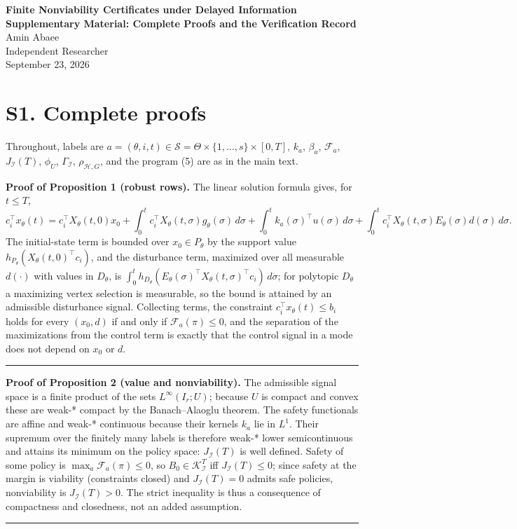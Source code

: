 \documentclass[10pt,article]{article}
\newcommand{\rulebar}{\begin{center}\rule{0.5\linewidth}{0.5pt}\end{center}}
\begin{document}
\begin{center}
{\Large\bfseries Finite Nonviability Certificates under Delayed Information}\\[0.4em]
{\large\bfseries Supplementary Material: Complete Proofs and the Verification Record}\\[0.6em]
Amin Abaee\\
{\small Independent Researcher}\\
{\small September 23, 2026}
\end{center}

\section*{S1. Complete proofs}

Throughout, labels are \(a = (\theta, i, t) \in \mathscr S = \Theta \times
\{1,\dots,s\} \times [0,T]\), \(k_a\), \(\beta_a\), \(\mathcal F_a\),
\(J_{\mathcal I}(T)\), \(\phi_U\), \(\Gamma_{\mathcal I}\),
\(\rho_{\mathcal H,G}\), and the program (5) are as in the main text.

\textbf{Proof of Proposition 1 (robust rows).} The linear solution formula
gives, for \(t \le T\),
\[
c_i^\top x_\theta(t) = c_i^\top X_\theta(t,0)x_0 + \int_0^t c_i^\top
X_\theta(t,\sigma) g_\theta(\sigma)\,d\sigma + \int_0^t k_a(\sigma)^\top
u(\sigma)\, d\sigma + \int_0^t c_i^\top X_\theta(t,\sigma)E_\theta(\sigma)
d(\sigma)\, d\sigma .
\]
The initial-state term is bounded over \(x_0 \in P_\theta\) by the support
value \(h_{P_\theta}(X_\theta(t,0)^\top c_i)\), and the disturbance term,
maximized over all measurable \(d(\cdot)\) with values in \(D_\theta\), is
\(\int_0^t h_{D_\theta}(E_\theta(\sigma)^\top X_\theta(t,\sigma)^\top
c_i)\, d\sigma\); for polytopic \(D_\theta\) a maximizing vertex selection is
measurable, so the bound is attained by an admissible disturbance signal.
Collecting terms, the constraint \(c_i^\top x_\theta(t) \le b_i\) holds for
every \((x_0, d)\) if and only if \(\mathcal F_a(\pi) \le 0\), and the
separation of the maximizations from the control term is exactly that the
control signal in a mode does not depend on \(x_0\) or \(d\).
\rulebar

\textbf{Proof of Proposition 2 (value and nonviability).} The admissible
signal space is a finite product of the sets \(L^\infty(I_r; U)\); because
\(U\) is compact and convex these are weak-* compact by the Banach--Alaoglu
theorem. The safety functionals are affine and weak-* continuous because
their kernels \(k_a\) lie in \(L^1\). Their supremum over the finitely many
labels is therefore weak-* lower semicontinuous and attains its minimum on
the policy space: \(J_{\mathcal I}(T)\) is well defined. Safety of some
policy is \(\max_a \mathcal F_a(\pi) \le 0\), so \(B_0 \in
\mathcal K_{\mathcal I}^T\) iff \(J_{\mathcal I}(T) \le 0\); since safety at
the margin is viability (constraints closed) and \(J_{\mathcal I}(T) = 0\)
admits safe policies, nonviability is \(J_{\mathcal I}(T) > 0\). The strict
inequality is thus a consequence of compactness and closedness, not an added
assumption.
\rulebar
\end{document}
